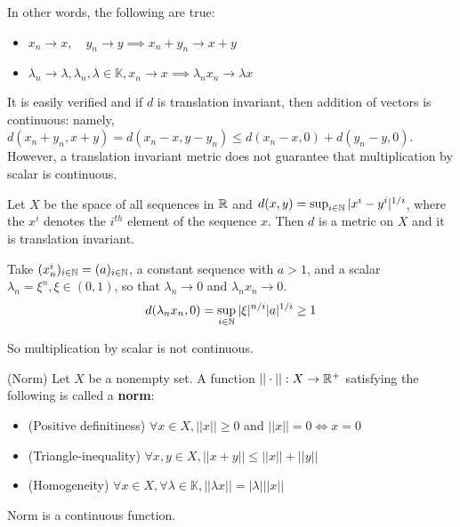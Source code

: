 \documentclass{article}
\begin{document}
In other words, the following are true:  

\begin{itemize}
    \item $x_n \to x, \quad y_n \to y \implies x_n + y_n \to x + y$
    \item $\lambda_n \to \lambda, \lambda_n, \lambda \in \mathbb{K},  x_n \to x \implies \lambda_n x_n \to \lambda x$
\end{itemize}  

It is easily verified and if $d$ is translation invariant, then addition of vectors is continuous: namely,
$d(x_n+y_n, x+y)=d(x_n-x, y-y_n) \leq d(x_n-x,0)+ d(y_n-y, 0)$.  However, a translation invariant metric does not
guarantee that multiplication by scalar is continuous.  

\begin{eg}
    Let $X$ be the space of all sequences in $\mathbb{R}$ and $d(x,y) = \sup_{i\in \mathbb{N}} |x^i-y^i|^{1/i}$, where the $x^i$
    denotes the $i^{th}$ element of the sequence $x$. Then $d$ is a metric on $X$ and it is translation invariant.  
    
    Take $(x^i_n)_{i\in \mathbb{N}}=(a)_{i \in \mathbb{N}}$, a constant sequence with $a>1$, and a scalar $\lambda_n = \xi^n, \xi \in (0,1)$, so that $\lambda_n \to 0$
    and $\lambda_n x_n \to 0$.  
    \begin{equation*}
        d(\lambda_n x_n, 0) = \sup_{i\in \mathbb{N}} |\xi|^{n/i} |a|^{1/i} \geq 1
    \end{equation*}  

    So multiplication by scalar is not continuous.
\end{eg}

\begin{defn}
    (Norm) Let $X$ be a nonempty set. A function $||\cdot||: X \to \mathbb{R}^+$ satisfying the following 
    is called a \textbf{norm}:
    \begin{itemize}
        \item (Positive definitiness) $\forall x \in X, ||x|| \geq 0$ and $||x||=0 \iff x=0$
        \item (Triangle-inequality) $\forall x,y \in X, ||x+y|| \leq ||x|| + ||y||$
        \item (Homogeneity) $\forall x \in X, \forall \lambda \in \mathbb{K}, ||\lambda x|| = |\lambda| ||x||$
    \end{itemize}
\end{defn}  

\begin{remark}
    Norm is a continuous function.
\end{remark}
\end{document}
